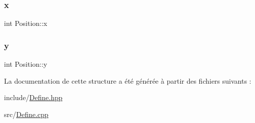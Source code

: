 \subsubsection{\texorpdfstring{x}{x}}
{\footnotesize\ttfamily int Position\+::x}

\mbox{\label{structPosition_a3c08e9213d4726b21caba3073192c4a3}} 
\subsubsection{\texorpdfstring{y}{y}}
{\footnotesize\ttfamily int Position\+::y}



La documentation de cette structure a été générée à partir des fichiers suivants \+:\begin{DoxyCompactItemize}
\item 
include/\hyperlink{Define_8hpp}{Define.\+hpp}\item 
src/\hyperlink{Define_8cpp}{Define.\+cpp}\end{DoxyCompactItemize}
